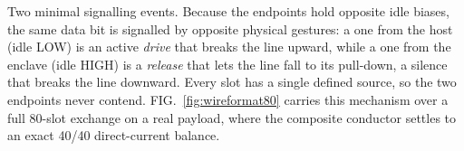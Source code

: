 \documentclass[12pt,letterpaper]{article}
\newcounter{fig}
\newcommand{\figref}[1]{FIG.~\ref{fig:#1}}
\begin{document}
\begin{center}
\vspace{0.3em}
\begin{center}\begin{minipage}{0.9\textwidth}
\footnotesize Two minimal signalling events. Because the endpoints hold opposite idle biases, the same data bit is signalled by opposite physical gestures: a one from the host (idle LOW) is an active \emph{drive} that breaks the line upward, while a one from the enclave (idle HIGH) is a \emph{release} that lets the line fall to its pull-down, a silence that breaks the line downward. Every slot has a single defined source, so the two endpoints never contend. \figref{wireformat80} carries this mechanism over a full 80-slot exchange on a real payload, where the composite conductor settles to an exact 40/40 direct-current balance.
\end{minipage}\end{center}
\end{center}

\vspace{1.4em}
\end{document}
